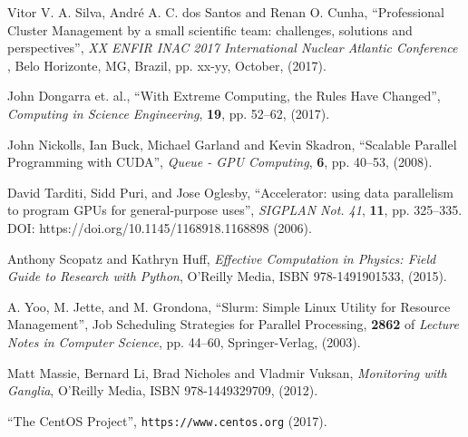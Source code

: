 \documentclass[twoside,a4paper,12pt,english]{inac19}
\begin{document}

\begin{thebibliography}{99} %

 Vitor V. A. Silva, Andr\'{e} A. C. dos Santos and Renan O. Cunha, ``Professional Cluster Management
  by a small scientific team: challenges, solutions and perspectives'', \textit{XX ENFIR INAC 2017 International Nuclear Atlantic Conference }, Belo Horizonte, MG, Brazil, pp. xx-yy, October, (2017). 
  
  
 John Dongarra et. al., ``With Extreme Computing, the Rules Have Changed'', \textit{Computing in Science Engineering}, \textbf{19}, pp. 52--62, (2017).
  
 John Nickolls, Ian Buck, Michael Garland and Kevin Skadron, ``Scalable Parallel Programming with CUDA'', \textit{Queue - GPU Computing}, \textbf{6}, pp. 40--53, (2008).
  
 David Tarditi, Sidd Puri, and Jose Oglesby, ``Accelerator: using data parallelism to program GPUs for general-purpose uses'',  \textit{SIGPLAN Not. 41}, \textbf{11}, pp. 325--335. DOI: https://doi.org/10.1145/1168918.1168898 (2006).

 Anthony Scopatz and Kathryn Huff, \textit{Effective Computation in Physics: Field Guide to Research with Python}, O'Reilly Media, ISBN 978-1491901533, (2015).
  
 A. Yoo, M. Jette, and M. Grondona, ``Slurm: Simple Linux Utility for Resource Management'', Job Scheduling Strategies for Parallel Processing, \textbf{2862} of \textit{Lecture Notes in Computer Science}, pp. 44--60, Springer-Verlag, (2003).
  

 Matt Massie, Bernard Li, Brad Nicholes and Vladmir Vuksan, \textit{Monitoring with Ganglia}, O'Reilly Media, ISBN 978-1449329709, (2012).

 ``The CentOS Project'', \verb#https://www.centos.org# (2017).


\end{thebibliography}
\end{document}
